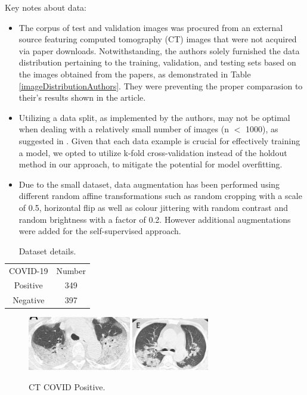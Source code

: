 \documentclass[runningheads]{llncs}
\begin{document}
Key notes about data:
\begin{itemize}
  \item The corpus of test and validation images was procured from an external source featuring computed tomography (CT) images that were not acquired via paper downloads. Notwithstanding, the authors solely furnished the data distribution pertaining to the training, validation, and testing sets based on the images obtained from the papers, as demonstrated in Table \ref{imageDistributionAuthors}. They were preventing the proper comparasion to their's results shown in the article.
  \item Utilizing a data split, as implemented by the authors, may not be optimal when dealing with a relatively small number of images (n $<$ 1000), as suggested in \cite{kfoldcrossvalidationN1000}. Given that each data example is crucial for effectively training a model, we opted to utilize k-fold cross-validation instead of the holdout method in our approach, to mitigate the potential for model overfitting.
  \item Due to the small dataset, data augmentation has been performed using different random affine transformations such as random cropping with a scale of 0.5, horizontal flip as well as colour jittering with random contrast and random brightness with a factor of 0.2. However additional augmentations were added for the self-supervised approach.
\end{itemize}

\begin{table}[h]
\label{imageDetails}
\centering
\caption{Dataset details.}
\begin{tabular}{c|c}
\cline{1-2}
 COVID-19 & Number \\ \cline{1-2}
 Positive & 349 \\ \cline{1-2}
 Negative & 397  \\ \cline{1-2}
\end{tabular}
\end{table} 

\begin{figure}[h]
\centering
{
\includegraphics[width=0.40\textwidth]{imagesDatasetSection/covid1.png}
}
\quad
{
\includegraphics[width=0.30\textwidth]{imagesDatasetSection/covid2.png}
}
\label{covidPositive}
\caption{CT COVID Positive.}
\end{figure}
\end{document}
